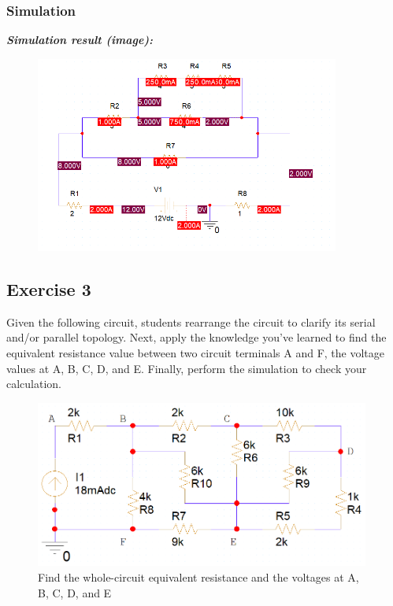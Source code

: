 \subsubsection{Simulation}
\textit{\textbf{Simulation result (image):}}
\begin{figure}[H]
    \centering
    \includegraphics[width = 10cm]{source/picture/bai_1/ex2_sim.png}
\end{figure}
\newpage

\subsection{Exercise 3}
Given the following circuit, students rearrange the circuit to clarify its serial and/or parallel topology. Next, apply the knowledge you've learned to find the equivalent resistance value between two circuit terminals A and F, the voltage values at A, B, C, D, and E. Finally, perform the simulation to check your calculation.

\begin{figure}[H]
    \centering
    \includegraphics[width = 11cm]{source/picture/bai_1/LAB1_EX3_de.png}
    \caption{Find the whole-circuit equivalent resistance and the voltages at A, B, C, D, and E}
    \label{lab1_ex3_de}
\end{figure}

